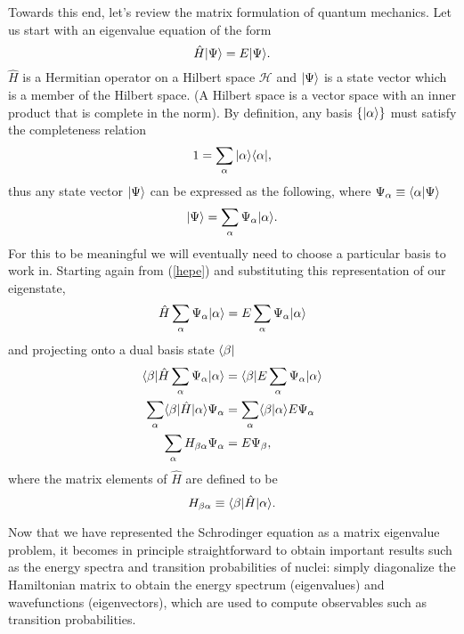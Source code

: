 Towards this end, let's review the matrix formulation of quantum mechanics. 
Let us start with an eigenvalue equation of the form
\begin{equation}\label{hepe}
	\hat{H}|\Psi\rangle=E|\Psi\rangle.
\end{equation}
$\hat{H}$ is a Hermitian operator on a Hilbert space $\mathcal{H}$ and $|\Psi\rangle$ is 
a state vector which is a member of the 
Hilbert space. (A Hilbert space is a vector space with an inner product
that is complete in the norm)\cite{Hall}. By definition, any basis 
$\{|\alpha\rangle\}$ must satisfy the completeness relation
\begin{equation}
1 = \sum_\alpha |\alpha\rangle\langle \alpha|,
\end{equation}
thus any state vector $|\Psi\rangle$ can be expressed as the following, where 
$\Psi_\alpha \equiv \langle \alpha|\Psi\rangle$
\begin{equation}
	|\Psi\rangle = \sum_\alpha \Psi_\alpha |\alpha\rangle.
\end{equation}
For this to be meaningful we will eventually need to choose a particular basis 
to work in. Starting again from (\ref{hepe}) and substituting this representation 
of our eigenstate,
\begin{equation}\begin{split}	
        \hat{H}\sum_\alpha \Psi_\alpha|\alpha\rangle = E\sum_\alpha \Psi_\alpha|\alpha\rangle
\end{split}\end{equation}
and projecting onto a dual basis state $\langle \beta|$       
\begin{equation}\begin{split}
	\langle \beta|\hat{H}\sum_\alpha \Psi_\alpha|\alpha\rangle &= \langle \beta|E\sum_\alpha \Psi_\alpha |\alpha\rangle \\
        \sum_\alpha \langle \beta|\hat{H}|\alpha\rangle\Psi_\alpha &= \sum_\alpha \langle \beta|\alpha\rangle E\Psi_\alpha \\
        \sum_\alpha H_{\beta\alpha} \Psi_\alpha &= E\Psi_\beta,
\end{split}\end{equation}
where the matrix elements of $\hat{H}$ are defined to be
\begin{equation}
	H_{\beta\alpha} \equiv \langle \beta|\hat{H}|\alpha\rangle.
\end{equation}

Now that we have represented the Schrodinger equation as a matrix eigenvalue problem, 
it becomes in principle straightforward to obtain important results such 
as the energy spectra and transition probabilities of nuclei: simply diagonalize
the Hamiltonian matrix to obtain the energy spectrum (eigenvalues) and 
wavefunctions (eigenvectors), which are used to compute observables such as
transition probabilities.

